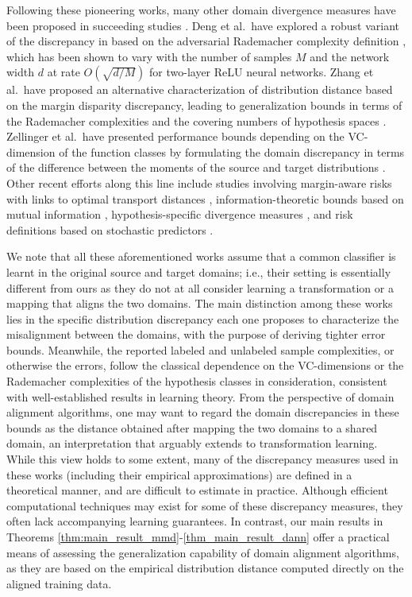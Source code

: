 \documentclass[review,supplement,onefignum,onetabnum]{siamonline250211}
\begin{document}
 
Following these pioneering works, many other domain divergence measures have been proposed in succeeding studies \cite{RedkoMHS20}. Deng et al.~have explored a robust variant of the discrepancy in  \cite{MansourMR09} based on the adversarial Rademacher complexity definition  \cite{DengGHML23}, which has been shown to vary with the number of samples $M$ and the network width $d$ at rate $O(\sqrt{d/M})$ for two-layer ReLU neural networks. Zhang et al.~have proposed an alternative characterization of distribution distance based on the margin disparity discrepancy, leading to generalization bounds in terms of the Rademacher complexities and the covering numbers of hypothesis spaces \cite{ZhangLLJ19}. Zellinger et al.~have presented performance bounds depending on the VC-dimension of the function classes by formulating the domain discrepancy in terms of the difference between the moments of the source and target distributions \cite{ZellingerMS21}. Other recent efforts along this line include studies involving margin-aware risks with links to optimal transport distances \cite{DhouibRL20}, information-theoretic bounds based on mutual information \cite{WangM23, WuMAZ24}, hypothesis-specific divergence measures \cite{WangM24}, and risk definitions based on stochastic predictors \cite{SiciliaAAH22}.





\begin{remark} 
We note that all these aforementioned works assume that a common classifier is learnt in the original source and target domains; i.e., their setting is essentially different from ours as they do not at all consider learning a transformation or a mapping that aligns the two domains. The main distinction among these works lies in the specific distribution discrepancy each one proposes to characterize the misalignment between the domains, with the purpose of deriving tighter error bounds.  Meanwhile, the reported labeled and unlabeled sample complexities, or otherwise the errors, follow the classical dependence on the VC-dimensions or the Rademacher complexities of the hypothesis classes in consideration, consistent with well-established results in learning theory. From the perspective of domain alignment algorithms, one may want to regard the domain discrepancies in these bounds as the distance obtained after mapping the two domains to a shared domain, an interpretation that arguably extends to transformation learning. While this view holds to some extent, many of the discrepancy measures used in these works (including their empirical approximations) are defined in a theoretical manner, and are difficult to estimate in practice. Although efficient computational techniques may exist for some of these discrepancy measures, they often lack accompanying learning guarantees. In contrast, our main results in Theorems \ref{thm:main_result_mmd}-\ref{thm_main_result_dann} offer a practical means of assessing the generalization capability of domain alignment algorithms, as they are based on the empirical distribution distance computed directly on the aligned training data.
\end{remark}
\end{document}
